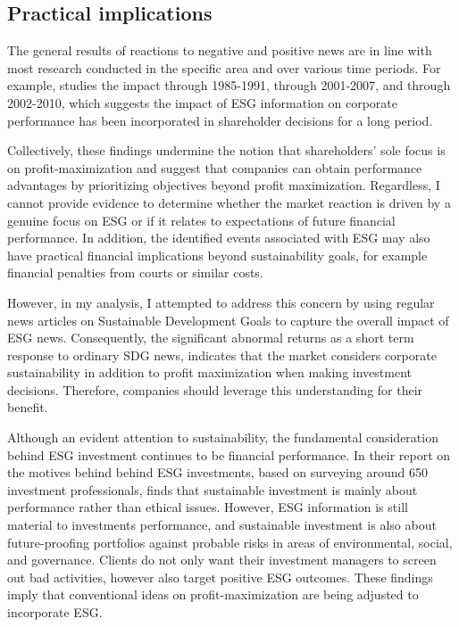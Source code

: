 
\subsection{Practical implications}

The general results of reactions to negative and positive news are in line with most research conducted in the specific area and over various time periods. For example, \cite{klassen1996impact} studies the impact through 1985-1991, \cite{kruger2015corporate} through 2001-2007, and \cite{Blancard_ESG_sentiment} through 2002-2010, which suggests the impact of ESG information on corporate performance has been incorporated in shareholder decisions for a long period. 

Collectively, these findings undermine the notion that shareholders' sole focus is on profit-maximization and suggest that companies can obtain performance advantages by prioritizing objectives beyond profit maximization. Regardless, I cannot provide evidence to determine whether the market reaction is driven by a genuine focus on ESG or if it relates to expectations of future financial performance. In addition, the identified events associated with ESG may also have practical financial implications beyond sustainability goals, for example financial penalties from courts or similar costs. 

However, in my analysis, I attempted to address this concern by using regular news articles on Sustainable Development Goals to capture the overall impact of ESG news. Consequently, the significant abnormal returns as a short term response to ordinary SDG news, indicates that the market considers corporate sustainability in addition to profit maximization when making investment decisions. Therefore, companies should leverage this understanding for their benefit.

Although an evident attention to sustainability, the fundamental consideration behind ESG investment continues to be financial performance. In their report on the motives behind behind ESG investments, based on surveying around 650 investment professionals, \cite{ESG_survey} finds that sustainable investment is mainly about performance rather than ethical issues. However, ESG information is still material to investments performance, and sustainable investment is also about future-proofing portfolios against probable risks in areas of environmental, social, and governance. Clients do not only want their investment managers to screen out bad activities, however also target positive ESG outcomes. These findings imply that conventional ideas on profit-maximization are being adjusted to incorporate ESG. 


